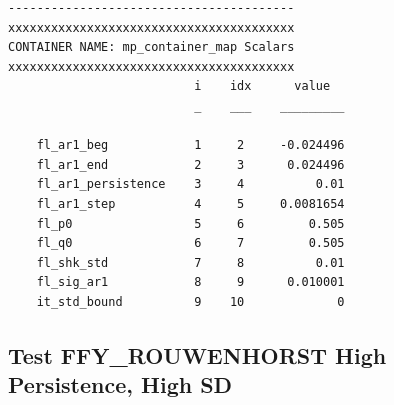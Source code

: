 \documentclass[
]{book}
\begin{document}
\begin{verbatim}
----------------------------------------
xxxxxxxxxxxxxxxxxxxxxxxxxxxxxxxxxxxxxxxx
CONTAINER NAME: mp_container_map Scalars
xxxxxxxxxxxxxxxxxxxxxxxxxxxxxxxxxxxxxxxx
                          i    idx      value  
                          _    ___    _________

    fl_ar1_beg            1     2     -0.024496
    fl_ar1_end            2     3      0.024496
    fl_ar1_persistence    3     4          0.01
    fl_ar1_step           4     5     0.0081654
    fl_p0                 5     6         0.505
    fl_q0                 6     7         0.505
    fl_shk_std            7     8          0.01
    fl_sig_ar1            8     9      0.010001
    it_std_bound          9    10             0
\end{verbatim}

\hypertarget{test-ffy_rouwenhorst-high-persistence-high-sd}{%
\subsection{Test FFY\_ROUWENHORST High Persistence, High SD}\label{test-ffy_rouwenhorst-high-persistence-high-sd}}
\end{document}

